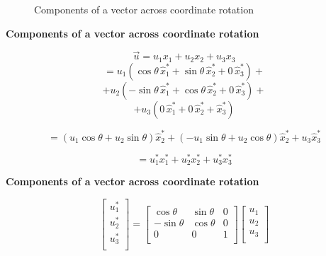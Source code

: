\begin{figure}[h]
\begin{center}
\end{center}
\caption{Components of a vector across coordinate rotation}
\label{rotationofaxes7}
\end{figure}



{\bf Components of a vector across coordinate rotation}

$$ \vec{u} = u_1 x_1 + u_2 x_2 + u_3 x_3 $$
$$ = u_1 \left( \cos\theta \, \hat{x}^*_1 + \sin\theta \, \hat{x}^*_2 + 0 \, \hat{x}^*_3 \right) + $$
$$ + u_2 \left( -\sin\theta \, \hat{x}^*_1 + \cos\theta \, \hat{x}^*_2 + 0 \, \hat{x}^*_3 \right) +$$
$$ + u_3 \left( 0 \, \hat{x}^*_1 + 0 \, \hat{x}^*_2 + \hat{x}^*_3 \right) $$

$$ = \left( u_1 \cos\theta + u_2 \sin\theta \right) \hat{x}^*_2 + \left( -u_1 \sin\theta + u_2 \cos\theta \right) \hat{x}^*_2 + u_3 \hat{x}^*_3 $$

$$ = u^*_1 x^*_1 + u^*_2 x^*_2 + u^*_3 x^*_3  $$



{\bf Components of a vector across coordinate rotation}

\begin{equation*}
\left[ 
\begin{array}{l}
u^*_1  \\
u^*_2 \\
u^*_3  \\
\end{array}
\right] 
= \left[ 
\begin{array}{lll}
 \cos\theta  &  \sin\theta  & 0\\
 -\sin\theta &  \cos\theta  & 0 \\
  0 & 0 & 1\\
\end{array}
\right] 
\left[ 
\begin{array}{l}
u_1 \\
u_2 \\
u_3 \\
\end{array}
\right]
\end{equation*}

